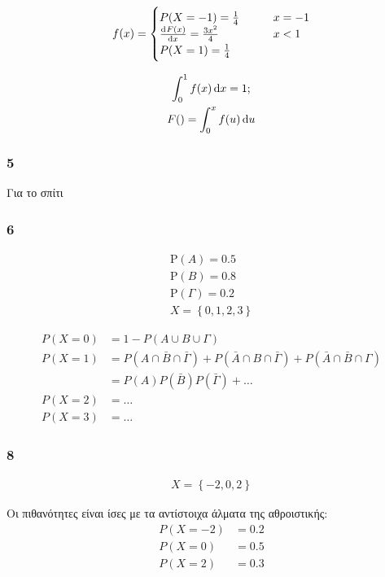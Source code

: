 \documentclass[11pt,a4paper,titlepage,draft]{article}
\begin{document}
\[
f(x)=\begin{cases}
P(X=-1)=\frac{1}{4} \qquad& x=-1\\
\od{F(x)}{x}=\frac{3x^2}{4}& x<1\\
P(X=1)=\frac{1}{4}
\end{cases}
\]

\begin{gather*}
\int_0^1 f(x)\dif x = 1;\\
F() = \int_0^x f(u)\dif u
\end{gather*}


\subsubsection*{5}
Για το σπίτι

\subsubsection*{6}
\begin{gather*}
\mathrm P(A)=0.5\\
\mathrm P(B)=0.8\\
\mathrm P(\Gamma)=0.2\\
X= \left\lbrace 0,1,2,3 \right\rbrace
\end{gather*}

\begin{align*}
P(X=0)&=1-P(A\cup B\cup  \Gamma )\\
P(X=1)&=P(A\cap\bar B\cap\bar \Gamma )+P(\bar A \cap B \cap\bar\Gamma)+P(\bar A\cap\bar B\cap \Gamma )\\
&= P(A)P(\bar B)P(\bar \Gamma)+\dots\\
P(X=2)&=\dots\\
P(X=3)&=\dots
\end{align*}

\subsubsection*{8}
\begin{gather*}
X= \left\lbrace -2,0,2 \right\rbrace
\end{gather*}

Οι πιθανότητες είναι ίσες με τα αντίστοιχα άλματα της αθροιστικής:
\begin{align*}
P(X=-2)&=0.2\\
P(X=0)&=0.5\\
P(X=2)&=0.3
\end{align*}
\end{document}
